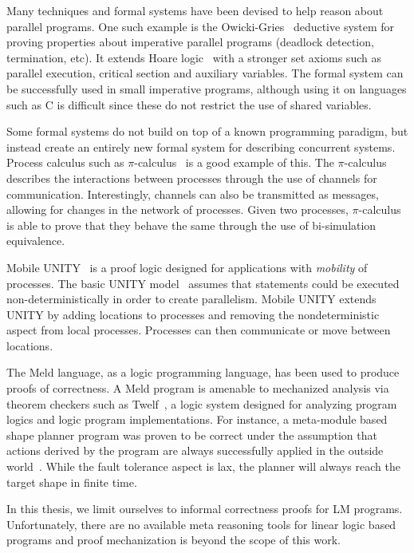 Many techniques and formal systems have been devised to help reason about
parallel programs.  One such example is the
Owicki-Gries~\cite{Owicki:1976:VPP:360051.360224} deductive system for proving
properties about imperative parallel programs (deadlock detection, termination,
etc). It extends Hoare logic~\cite{Hoare:1969} with a stronger set axioms such
as parallel execution, critical section and auxiliary variables. The formal
system can be successfully used in small imperative programs, although using it
on languages such as C is difficult since these do not restrict the use of
shared variables.

Some formal systems do not build on top of a known programming paradigm, but
instead create an entirely new formal system for describing concurrent systems.
Process calculus such as $\pi$-calculus~\cite{Milner:1999:CMS:329902} is a good
example of this.  The $\pi$-calculus describes the interactions between
processes through the use of channels for communication. Interestingly, channels
can also be transmitted as messages, allowing for changes in the network of
processes.  Given two processes, $\pi$-calculus is able to prove that they
behave the same through the use of bi-simulation equivalence.

Mobile UNITY~\cite{Roman97anintroduction} is a proof logic designed for
applications with \emph{mobility} of processes. The basic UNITY
model~\cite{UNITY} assumes that statements could be executed
non-deterministically in order to create parallelism. Mobile UNITY extends UNITY
by adding locations to processes and removing the nondeterministic aspect from
local processes.  Processes can then communicate or move between locations.

The Meld language, as a logic programming language, has been used to produce
proofs of correctness. A Meld program is amenable to mechanized analysis via
theorem checkers such as Twelf~\cite{twelf}, a logic system designed for
analyzing program logics and logic program implementations. For instance, a
meta-module based shape planner program was proven to be correct under the
assumption that actions derived by the program are always successfully applied
in the outside world~\cite{dewey-iros08,ashley-rollman-iclp09}.  While the fault
tolerance aspect is lax, the planner will always reach the target shape in
finite time.

In this thesis, we limit ourselves to informal correctness proofs for LM
programs. Unfortunately, there are no available meta reasoning tools for linear
logic based programs and proof mechanization is beyond the scope of this work.
